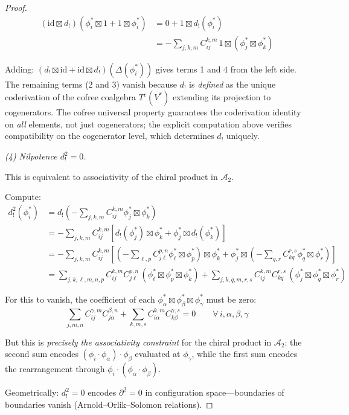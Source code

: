 \begin{proof}
\begin{align*}
(\mathrm{id} \boxtimes d_!)(\phi_i^* \boxtimes 1 + 1 \boxtimes \phi_i^*) &= 0 + 1 \boxtimes d_!(\phi_i^*) \\
&= -\sum_{j,k,m} C_{ij}^{k,m} \, 1 \boxtimes (\phi_j^* \boxtimes \phi_k^*)
\end{align*}

Adding: $(d_! \boxtimes \mathrm{id} + \mathrm{id} \boxtimes d_!)(\Delta(\phi_i^*))$ gives terms 1 and 4 from the left side.  The remaining terms (2 and 3) vanish because $d_!$ is \emph{defined} as the unique coderivation of the cofree coalgebra $T^c(V^*)$ extending its projection to cogenerators.  The cofree universal property guarantees the coderivation identity on \emph{all} elements, not just cogenerators; the explicit computation above verifies compatibility on the cogenerator level, which determines $d_!$ uniquely.

\medskip
\noindent\emph{(4) Nilpotence $d_!^2 = 0$.}

This is equivalent to associativity of the chiral product in $\mathcal{A}_2$.

Compute:
\begin{align*}
d_!^2(\phi_i^*) &= d_!\left(-\sum_{j,k,m} C_{ij}^{k,m} \phi_j^* \boxtimes \phi_k^*\right) \\
&= -\sum_{j,k,m} C_{ij}^{k,m} [d_!(\phi_j^*) \boxtimes \phi_k^* + \phi_j^* \boxtimes d_!(\phi_k^*)] \\
&= -\sum_{j,k,m} C_{ij}^{k,m} \left[\left(-\sum_{\ell,p} C_{j\ell}^{p,n} \phi_\ell^* \boxtimes \phi_p^*\right) \boxtimes \phi_k^* + \phi_j^* \boxtimes \left(-\sum_{q,r} C_{kq}^{r,s} \phi_q^* \boxtimes \phi_r^*\right)\right] \\
&= \sum_{j,k,\ell,m,n,p} C_{ij}^{k,m} C_{j\ell}^{p,n} \,(\phi_\ell^* \boxtimes \phi_p^* \boxtimes \phi_k^*) + \sum_{j,k,q,m,r,s} C_{ij}^{k,m} C_{kq}^{r,s} \,(\phi_j^* \boxtimes \phi_q^* \boxtimes \phi_r^*)
\end{align*}

For this to vanish, the coefficient of each $\phi_\alpha^* \boxtimes \phi_\beta^* \boxtimes \phi_\gamma^*$ must be zero:
\[\sum_{j,m,n} C_{ij}^{\gamma,m} C_{j\alpha}^{\beta,n} + \sum_{k,m,s} C_{i\alpha}^{k,m} C_{k\beta}^{\gamma,s} = 0 \qquad \forall\, i, \alpha, \beta, \gamma\]

But this is \emph{precisely the associativity constraint} for the chiral product in $\mathcal{A}_2$: the second sum encodes $(\phi_i \cdot \phi_\alpha) \cdot \phi_\beta$ evaluated at $\phi_\gamma$, while the first sum encodes the rearrangement through $\phi_i \cdot (\phi_\alpha \cdot \phi_\beta)$.

Geometrically: $d_!^2 = 0$ encodes $\partial^2 = 0$ in configuration space---boundaries of boundaries vanish (Arnold--Orlik--Solomon relations).
\end{proof}

